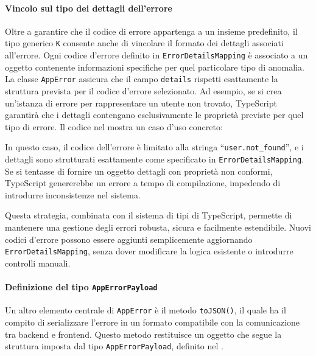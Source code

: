 \paragraph{Vincolo sul tipo dei dettagli dell’errore}
Oltre a garantire che il codice di errore appartenga a un insieme predefinito, il tipo generico \texttt{K} consente anche di vincolare il formato dei dettagli associati all’errore. Ogni codice d’errore definito in \texttt{ErrorDetailsMapping} è associato a un oggetto contenente informazioni specifiche per quel particolare tipo di anomalia. La classe \texttt{AppError} assicura che il campo \texttt{details} rispetti esattamente la struttura prevista per il codice d’errore selezionato.
%
Ad esempio, se si crea un'istanza di errore per rappresentare un utente non trovato, TypeScript garantirà che i dettagli contengano esclusivamente le proprietà previste per quel tipo di errore. Il codice nel  mostra un caso d’uso concreto:


%
In questo caso, il codice dell'errore è limitato alla stringa ``\texttt{user.not\_found}'', e i dettagli sono strutturati esattamente come specificato in \texttt{ErrorDetailsMapping}. Se si tentasse di fornire un oggetto dettagli con proprietà non conformi, TypeScript genererebbe un errore a tempo di compilazione, impedendo di introdurre inconsistenze nel sistema.

Questa strategia, combinata con il sistema di tipi di TypeScript, permette di mantenere una gestione degli errori robusta, sicura e facilmente estendibile. Nuovi codici d’errore possono essere aggiunti semplicemente aggiornando \texttt{ErrorDetailsMapping}, senza dover modificare la logica esistente o introdurre controlli manuali.

\paragraph{Definizione del tipo \texttt{AppErrorPayload}}
Un altro elemento centrale di \texttt{AppError} è il metodo \texttt{toJSON()}, il quale ha il compito di serializzare l’errore in un formato compatibile con la comunicazione tra backend e frontend. Questo metodo restituisce un oggetto che segue la struttura imposta dal tipo \texttt{AppErrorPayload}, definito nel .

